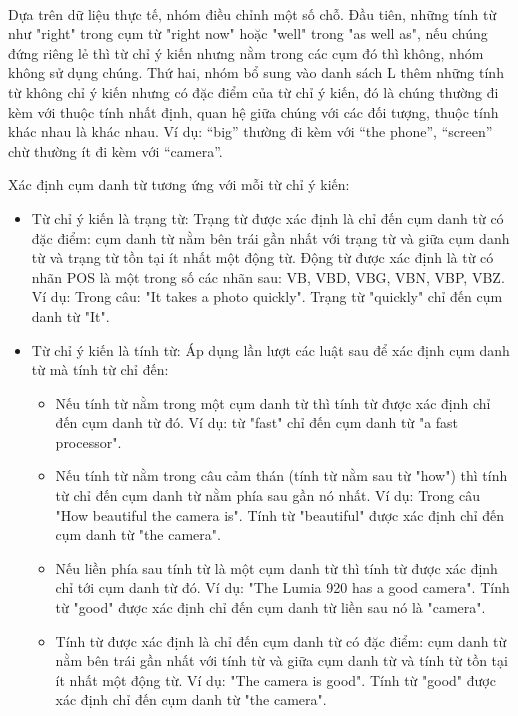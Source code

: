 \documentclass[12pt]{report}
\begin{document}
				\\ Dựa trên dữ liệu thực tế, nhóm điều chỉnh một số chỗ. Đầu tiên, những tính từ như "right" trong cụm từ "right now" hoặc "well" trong "as well as", nếu chúng đứng riêng lẻ thì từ chỉ ý kiến nhưng nằm trong các cụm đó thì không, nhóm không sử dụng chúng. Thứ hai, nhóm bổ sung vào danh sách L thêm những tính từ không chỉ ý kiến nhưng có đặc điểm của từ chỉ ý kiến, đó là chúng thường đi kèm với thuộc tính nhất định, quan hệ giữa chúng với các đối tượng, thuộc tính khác nhau là khác nhau. Ví dụ: “big” thường đi kèm với “the phone”, “screen” chừ thường ít đi kèm với “camera”.
				\par Xác định cụm danh từ tương ứng với mỗi từ chỉ ý kiến:
				\begin{itemize}
					\item{Từ chỉ ý kiến là trạng từ:
					Trạng từ được xác định là chỉ đến cụm danh từ có đặc điểm: cụm danh từ nằm bên trái gần nhất với trạng từ và giữa cụm danh từ và trạng từ tồn tại ít nhất một động từ. Động từ được xác định là từ có nhãn POS là một trong số các nhãn sau: VB, VBD, VBG, VBN, VBP, VBZ. Ví dụ: Trong câu: "It takes a photo quickly". Trạng từ "quickly" chỉ đến cụm danh từ "It".}
					\item{Từ chỉ ý kiến là tính từ: 
					Áp dụng lần lượt các luật sau để xác định cụm danh từ mà tính từ chỉ đến:
						\begin{itemize}
							\item{Nếu tính từ nằm trong một cụm danh từ thì tính từ được xác định chỉ đến cụm danh từ đó. Ví dụ: từ "fast" chỉ đến cụm danh từ "a fast processor".}
							\item{Nếu tính từ nằm trong câu cảm thán (tính từ nằm sau từ "how") thì tính từ chỉ đến cụm danh từ nằm phía sau gần nó nhất. Ví dụ: Trong câu "How beautiful the camera is". Tính từ "beautiful" được xác định chỉ đến cụm danh từ "the camera".}
							\item{Nếu liền phía sau tính từ là một cụm danh từ thì tính từ được xác định chỉ tới cụm danh từ đó. Ví dụ: "The Lumia 920 has a good camera". Tính từ "good" được xác định chỉ đến cụm danh từ liền sau nó là "camera".}
							\item{Tính từ được xác định là chỉ đến cụm danh từ có đặc điểm: cụm danh từ nằm bên trái gần nhất với tính từ và giữa cụm danh từ và tính từ tồn tại ít nhất một động từ. Ví dụ: "The camera is good". Tính từ "good" được xác định chỉ đến cụm danh từ "the camera".}
						\end{itemize}}
				\end{itemize}
\end{document}
